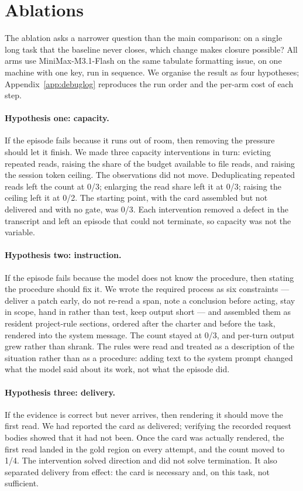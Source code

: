 \section{Ablations}
\label{sec:ablation}

The ablation asks a narrower question than the main comparison: on a single long task that the baseline never closes, which change makes closure possible? All arms use MiniMax-M3.1-Flash on the same tabulate formatting issue, on one machine with one key, run in sequence. We organise the result as four hypotheses; Appendix~\ref{app:debuglog} reproduces the run order and the per-arm cost of each step.

\paragraph{Hypothesis one: capacity.} If the episode fails because it runs out of room, then removing the pressure should let it finish.
We made three capacity interventions in turn: evicting repeated reads, raising the share of the budget available to file reads, and raising the session token ceiling.
The observations did not move. Deduplicating repeated reads left the count at 0/3; enlarging the read share left it at 0/3; raising the ceiling left it at 0/2.
The starting point, with the card assembled but not delivered and with no gate, was 0/3.
Each intervention removed a defect in the transcript and left an episode that could not terminate, so capacity was not the variable.

\paragraph{Hypothesis two: instruction.} If the episode fails because the model does not know the procedure, then stating the procedure should fix it.
We wrote the required process as six constraints --- deliver a patch early, do not re-read a span, note a conclusion before acting, stay in scope, hand in rather than test, keep output short --- and assembled them as resident project-rule sections, ordered after the charter and before the task, rendered into the system message.
The count stayed at 0/3, and per-turn output grew rather than shrank.
The rules were read and treated as a description of the situation rather than as a procedure: adding text to the system prompt changed what the model said about its work, not what the episode did.

\paragraph{Hypothesis three: delivery.} If the evidence is correct but never arrives, then rendering it should move the first read.
We had reported the card as delivered; verifying the recorded request bodies showed that it had not been. Once the card was actually rendered, the first read landed in the gold region on every attempt, and the count moved to 1/4.
The intervention solved direction and did not solve termination. It also separated delivery from effect: the card is necessary and, on this task, not sufficient.

